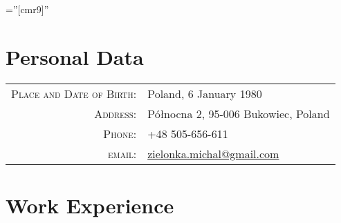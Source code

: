 \documentclass[a4paper,9pt]{article} %
\begin{document}
\pagestyle{empty} %

\font\fb=''[cmr9]'' %


\par{\bigskip\par} %

\section{Personal Data}

\begin{tabular}{rl}
\textsc{Place and Date of Birth:} & Poland, 6 January 1980 \\
\textsc{Address:} & Północna 2, 95-006 Bukowiec, Poland \\
\textsc{Phone:} & +48 505-656-611 \\
\textsc{email:} & \href{mailto:zielonka.michal@gmail.com}{zielonka.michal@gmail.com}
\end{tabular}


\section{Work Experience}
\end{document}

